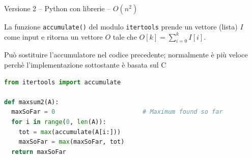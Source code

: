 
\begin{frame}[fragile]{Versione 2 -- Python con librerie -- $O(n^2)$}

\vspace{-6pt}
\begin{myboxtitle}
La funzione \texttt{accumulate()} del modulo \texttt{itertools} prende un vettore (lista) $I$ come input e ritorna un vettore $O$ tale che $O[k] = \sum_{i=0}^k I[i]$. 

\medskip
Può sostituire l'accumulatore nel codice precedente; normalmente è più veloce perchè l'implementazione sottostante è basata sul C
\end{myboxtitle}

\begin{lstlisting}[language=python]
from itertools import accumulate

def maxsum2(A):
  maxSoFar = 0                        # Maximum found so far
  for i in range(0, len(A)):
    tot = max(accumulate(A[i:]))
    maxSoFar = max(maxSoFar, tot)
  return maxSoFar
\end{lstlisting}


\end{frame}



